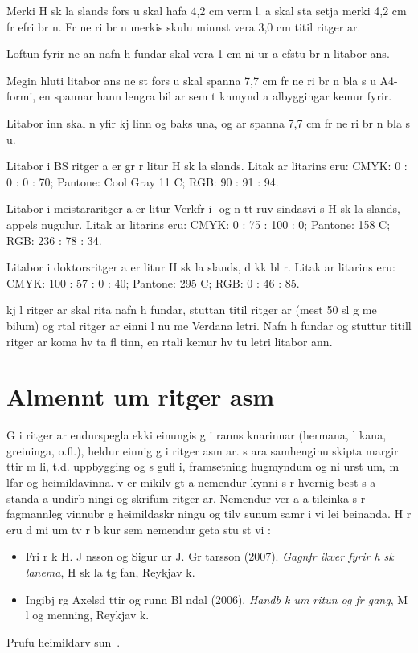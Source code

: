 \documentclass{article}
\begin{document}
Merki H sk la  slands   fors u skal hafa 4,2 cm  verm l.  a  skal sta setja merki  4,2 cm fr  efri br n. Fr  ne ri br n merkis skulu minnst vera 3,0 cm   titil ritger ar.

Loftun fyrir ne an nafn h fundar skal vera 1 cm ni ur a  efstu br n litabor ans.

Megin hluti litabor ans ne st   fors u skal spanna 7,7 cm fr  ne ri br n bla s u   A4-formi, en   spannar hann lengra bil  ar sem t knmynd a albyggingar kemur fyrir.

Litabor inn skal n  yfir kj linn og baks una, og  ar spanna 7,7 cm fr  ne ri br n bla s u.

Litabor i BS ritger a er gr r litur H sk la  slands. Litak ar litarins eru: CMYK: 0 : 0 : 0 : 70; Pantone: Cool Gray 11 C; RGB: 90 : 91 : 94.

Litabor i meistararitger a er litur Verkfr i- og n tt ruv sindasvi s H sk la  slands, appels nugulur. Litak ar litarins eru: CMYK:  0 : 75 : 100 : 0; Pantone: 158 C; RGB: 236 : 78 : 34.

Litabor i doktorsritger a er litur H sk la  slands, d kk bl r. Litak ar litarins eru: CMYK: 100 : 57 : 0 : 40; Pantone: 295 C; RGB: 0 : 46 : 85.

  kj l ritger ar skal rita nafn h fundar, stuttan titil ritger ar (mest 50 sl g me  bilum) og  rtal ritger ar   einni l nu me  Verdana letri. Nafn h fundar og stuttur titill ritger ar koma   hv ta fl tinn, en  rtali  kemur   hv tu letri   litabor ann.

\section{Almennt um ritger asm }
G i ritger ar endurspegla ekki einungis g i ranns knarinnar (hermana, l kana, greininga, o.fl.), heldur einnig g i ritger asm ar.   s ara samhenginu skipta margir  ttir m li, t.d. uppbygging og s gufl i, framsetning   hugmyndum og ni urst um, m lfar og heimildavinna.  v  er mikilv gt a  nemendur kynni s r hvernig best s  a  standa a  undirb ningi og skrifum ritger ar. Nemendur ver a a  tileinka s r fagmannleg vinnubr g    heimildaskr ningu og tilv sunum   samr i vi  lei beinanda. H r eru d mi um tv r b kur sem nemendur geta stu st vi :
\begin{itemize}
 \item Fri r k H. J nsson og Sigur ur J. Gr tarsson (2007). \textit{Gagnfr ikver fyrir h sk lanema}, H sk la tg fan, Reykjav k.
 \item Ingibj rg Axelsd ttir og  runn Bl ndal (2006).  \textit{Handb k um ritun og fr gang},  M l og menning, Reykjav k.
\end{itemize}
Prufu heimildarv sun~\cite{knuth-fa}.
\end{document}
